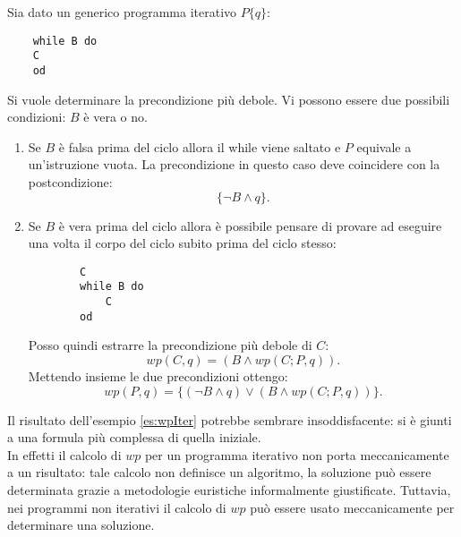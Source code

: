 \begin{es}
	\label{es:wpIter}
	Sia dato un generico programma iterativo $P\{q\}$:
	\begin{lstlisting}
	while B do
	C
	od
	\end{lstlisting}
	Si vuole determinare la precondizione pi\`u debole.
	Vi possono essere due possibili condizioni: $B$ \`e vera o no. 
	\begin{enumerate}
		\item Se $B$ \`e falsa prima del ciclo allora il while viene saltato e $P$ equivale a un'istruzione vuota. La precondizione in questo caso deve coincidere con la postcondizione: $$\{\neg B \land q \}.$$
		\item Se $B$ \`e vera prima del ciclo allora \`e possibile pensare di provare ad eseguire una volta il corpo del ciclo subito prima del ciclo stesso:
		\begin{lstlisting}
		C
		while B do
			C
		od
		\end{lstlisting}
		Posso quindi estrarre la precondizione pi\`u debole di $C$: $$wp(C, q) = (B \land wp(C;P,q)).$$
		Mettendo insieme le due precondizioni ottengo: $$wp(P, q)=\{(\neg B \land q )  \lor (B \land wp(C;P,q))\}.$$
	\end{enumerate}
\end{es}
Il risultato dell'esempio \ref{es:wpIter} potrebbe sembrare insoddisfacente: si \`e giunti a una formula pi\`u complessa di quella iniziale. \\
In effetti il calcolo di $wp$ per un programma iterativo non porta meccanicamente a un risultato: tale calcolo non definisce un algoritmo, la soluzione pu\`o essere determinata grazie a metodologie euristiche informalmente giustificate. Tuttavia, nei programmi non iterativi il calcolo di $wp$ pu\`o essere usato meccanicamente per determinare una soluzione.